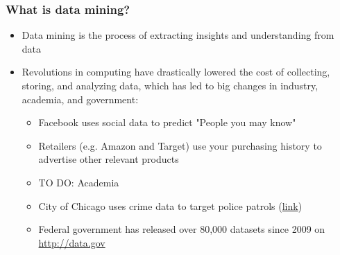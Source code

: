 \documentclass{beamer}
\begin{document}
\begin{frame}
\frametitle{What is data mining?}
\begin{itemize}
	\item Data mining is the process of extracting insights and understanding from data
	\item Revolutions in computing have drastically lowered the cost of collecting, storing, and analyzing data, which has led to big changes in industry, academia, and government:
	\begin{itemize}
		\item Facebook uses social data to predict "People you may know"
		\item Retailers (e.g. Amazon and Target) use your purchasing history to advertise other relevant products
		\item TO DO: Academia
		\item City of Chicago uses crime data to target police patrols (\href{http://dssg.io/projects/}{link})
		\item Federal government has released over 80,000 datasets since 2009 on \url{http://data.gov}
	\end{itemize}
\end{itemize}
\end{frame}
\end{document}
